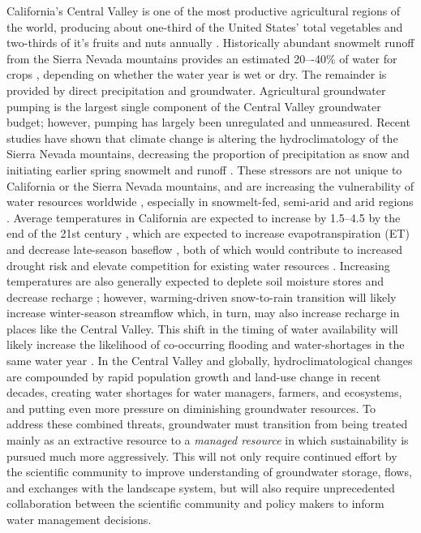 California’s Central Valley is one of the most productive agricultural regions of the world, producing about one-third of the United States’ total vegetables and two-thirds of it's fruits and nuts annually \citep{CDFA2019stats}. Historically abundant snowmelt runoff from the Sierra Nevada mountains provides an estimated 20–-40\% of water for crops \citep{faunt2009groundwater}, depending on whether the water year is wet or dry. The remainder is provided by direct precipitation and groundwater. Agricultural groundwater pumping is the largest single component of the Central Valley groundwater budget; however, pumping has largely been unregulated and unmeasured. Recent studies have shown that climate change is altering the hydroclimatology of the Sierra Nevada mountains, decreasing the proportion of precipitation as snow and initiating earlier spring snowmelt and runoff \citep{vicuna2007evolution,cayan2008climate,cayan2010future}. These stressors are not unique to California or the Sierra Nevada mountains, and are increasing the vulnerability of water resources worldwide \citep[e.g,][]{vicuna2011climate,stewart2005changes}, especially in snowmelt-fed, semi-arid and arid regions \citep{konikow2013groundwater}. Average temperatures in California are expected to increase by 1.5--4.5 by the end of the 21st century \citep{cayan2008climate}, which are expected to increase evapotranspiration (ET) and decrease late-season baseflow \citep{hayhoe2007past,huntington2012role}, both of which would contribute to increased drought risk and elevate competition for existing water resources \citep{gleick2000look}. Increasing temperatures are also generally expected to deplete soil moisture stores and decrease recharge \citep{bates2008climate}; however, warming-driven snow-to-rain transition will likely increase winter-season streamflow which, in turn, may also increase recharge in places like the Central Valley. This shift in the timing of water availability will likely increase the likelihood of co-occurring flooding and water-shortages in the same water year \citep{knowles2006trends}. In the Central Valley and globally, hydroclimatological changes are compounded by rapid population growth and land-use change in recent decades, creating water shortages for water managers, farmers, and ecosystems, and putting even more pressure on diminishing groundwater resources. To address these combined threats, groundwater must transition from being treated mainly as an extractive resource to a \textit{managed resource} in which sustainability is pursued much more aggressively. This will not only require continued effort by the scientific community to improve understanding of groundwater storage, flows, and exchanges with the landscape system, but will also require unprecedented collaboration between the scientific community and policy makers to inform water management decisions.

